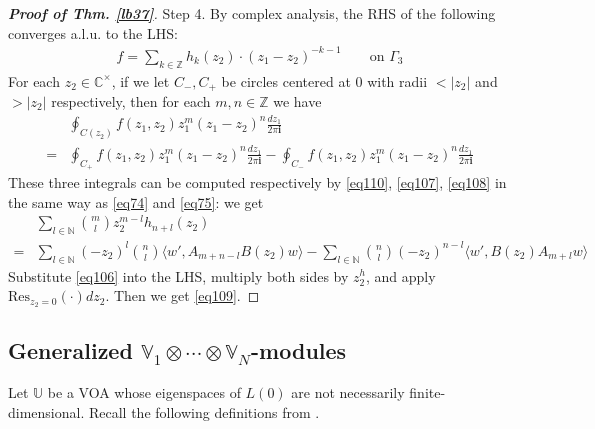 \documentclass[11pt,b5paper,notitlepage]{article}
\theoremstyle{definition}
\theoremstyle{plain}
\newcommand{\Res}{\mathrm{Res}}
\newcommand{\im}{\mathbf{i}}
\newcommand{\Vbb}{\mathbb V}
\newcommand{\Ubb}{\mathbb U}
\newcommand{\Wbb}{\mathbb W}
\newcommand{\Cbb}{\mathbb C}
\newcommand{\Nbb}{\mathbb N}
\newcommand{\Zbb}{\mathbb Z}
\newcommand{\<}{\left\langle}
\renewcommand{\>}{\right\rangle}
\newcommand{\fx}{\mathfrak{X}}
\newcommand{\bigbk}[1]{\big\langle {#1}\big\rangle}
\newcommand{\bbs}{\boxbackslash}
\numberwithin{equation}{subsection}
\begin{document}
\begin{proof}[\textbf{Proof of Thm. \ref{lb37}}]
Step 4. By complex analysis, the RHS of the following converges a.l.u. to the LHS:
\begin{align}
f=\sum_{k\in\Zbb} h_k(z_2)\cdot (z_1-z_2)^{-k-1} \qquad\text{on }\Gamma_3  \label{eq110}
\end{align}
For each $z_2\in\Cbb^\times$, if we let $C_-,C_+$ be circles centered at $0$ with radii $<|z_2|$ and $>|z_2|$ respectively, then for each $m,n\in\Zbb$ we have
\begin{align*}
&\oint_{C(z_2)}f(z_1,z_2)z_1^m(z_1-z_2)^n\frac{dz_1}{2\pi\im}\\
=&\oint_{C_+}f(z_1,z_2)z_1^m(z_1-z_2)^n\frac{dz_1}{2\pi\im}-\oint_{C_-}f(z_1,z_2)z_1^m(z_1-z_2)^n\frac{dz_1}{2\pi\im}
\end{align*}
These three integrals can be computed respectively by \eqref{eq110}, \eqref{eq107}, \eqref{eq108} in the same way as \eqref{eq74} and \eqref{eq75}: we get
\begin{align*}
&\sum_{l\in\Nbb}{m\choose l}z_2^{m-l}h_{n+l}(z_2)\\
=&\sum_{l\in\Nbb}(-z_2)^l{n\choose l}\bigbk{w',A_{m+n-l}B(z_2)w}-\sum_{l\in\Nbb}{n\choose l}(-z_2)^{n-l}\bigbk{w',B(z_2)A_{m+l}w}
\end{align*}
Substitute \eqref{eq106} into the LHS, multiply both sides by $z_2^h$, and apply $\Res_{z_2=0}(\cdot)dz_2$. Then we get \eqref{eq109}.
\end{proof}



\subsection{Generalized $\Vbb_1\otimes\cdots\otimes\Vbb_N$-modules}  \label{lb35}


Let $\Ubb$ be a VOA whose eigenspaces of $L(0)$ are not necessarily finite-dimensional. Recall the following definitions from \cite{Hua-projectivecover}.
\end{document}

